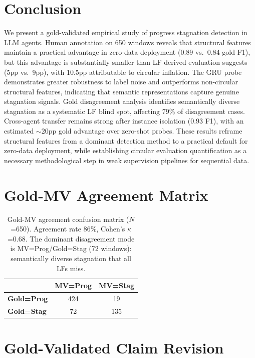 \documentclass[11pt,a4paper]{article}
\begin{document}
\section{Conclusion}

We present a gold-validated empirical study of progress stagnation detection in LLM agents.
Human annotation on 650 windows reveals that structural features maintain a practical advantage in zero-data deployment (0.89 vs.\ 0.84 gold F1), but this advantage is substantially smaller than LF-derived evaluation suggests (5pp vs.\ 9pp), with 10.5pp attributable to circular inflation.
The GRU probe demonstrates greater robustness to label noise and outperforms non-circular structural features, indicating that semantic representations capture genuine stagnation signals.
Gold disagreement analysis identifies semantically diverse stagnation as a systematic LF blind spot, affecting 79\% of disagreement cases.
Cross-agent transfer remains strong after instance isolation (0.93 F1), with an estimated $\sim$20pp gold advantage over zero-shot probes.
These results reframe structural features from a dominant detection method to a practical default for zero-data deployment, while establishing circular evaluation quantification as a necessary methodological step in weak supervision pipelines for sequential data.


\appendix
\section{Gold-MV Agreement Matrix}
\label{app:confusion}

\begin{table}[h]
\centering
\begin{tabular}{lcc}
\toprule
 & \textbf{MV=Prog} & \textbf{MV=Stag} \\
\midrule
\textbf{Gold=Prog} & 424 & 19 \\
\textbf{Gold=Stag} & 72 & 135 \\
\bottomrule
\end{tabular}
\caption{Gold-MV agreement confusion matrix ($N$=650). Agreement rate 86\%, Cohen's $\kappa$=0.68. The dominant disagreement mode is MV=Prog/Gold=Stag (72 windows): semantically diverse stagnation that all LFs miss.}
\label{tab:confusion}
\end{table}

\section{Gold-Validated Claim Revision}
\label{app:revision}
\end{document}
